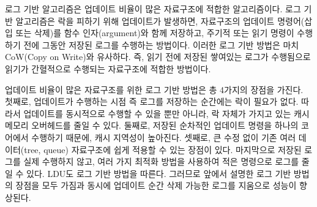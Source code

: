 
로그 기반 알고리즘은 업데이트 비율이 많은 자료구조에 적합한 알고리즘이다. 
로그 기반 알고리즘은 락을 피하기 위해 업데이트가 발생하면, 자료구조의 업데이트 
명령어(삽입 또는 삭제)를 함수 인자(argument)와 함께 저장하고, 주기적 또는 읽기 명령이
 수행하기 전에 그동안 저장된 로그를 수행하는 방법이다.
이러한 로그 기반 방법은 마치 CoW(Copy on Write)와 유사하다.
즉, 읽기 전에 저장된 쌓여있는 로그가 수행됨으로 읽기가 간혈적으로 수행되는 자료구조에 적합한 방법이다.

업데이트 비율이 많은 자료구조를 위한 로그 기반 방법은 총 4가지의 장점을 가진다. 
첫째로, 업데이트가 수행하는 시점 즉 로그를 저장하는 순간에는 락이 필요가 없다. 
따라서 업데이트를 동시적으로 수행할 수 있을 뿐만 아니라, 락 자체가 가지고 있는 캐시 메모리 오버헤드를 
줄일 수 있다. 
둘째로, 저장된 순차적인 업데이트 명령을 하나의 코어에서 수행하기 때문에, 캐시 지역성이 높아진다.
셋째로, 큰 수정 없이 기존 여러 데이터(tree, queue) 자료구조에 쉽게 적용할 수 있는 장점이 있다.
마지막으로 저장된 로그를 실제 수행하지 않고, 여러 가지 최적화 방법을 사용하여 적은 
명령으로 로그를 줄일 수 있다. 
LDU도 로그 기반 방법을 따른다. 그러므로 앞에서 설명한 로그 기반 방법의 장점을 모두 가짐과 동시에
업데이트 순간 삭제 가능한 로그를 지움으로 성능이 향상된다.


